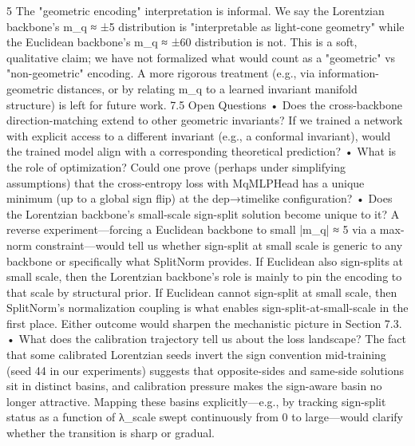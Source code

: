 	5	The "geometric encoding" interpretation is informal. We say the Lorentzian backbone's m_q ≈ ±5 distribution is "interpretable as light-cone geometry" while the Euclidean backbone's m_q ≈ ±60 distribution is not. This is a soft, qualitative claim; we have not formalized what would count as a "geometric" vs "non-geometric" encoding. A more rigorous treatment (e.g., via information-geometric distances, or by relating m_q to a learned invariant manifold structure) is left for future work.
7.5 Open Questions
	•	Does the cross-backbone direction-matching extend to other geometric invariants? If we trained a network with explicit access to a different invariant (e.g., a conformal invariant), would the trained model align with a corresponding theoretical prediction?
	•	What is the role of optimization? Could one prove (perhaps under simplifying assumptions) that the cross-entropy loss with MqMLPHead has a unique minimum (up to a global sign flip) at the dep→timelike configuration?
	•	Does the Lorentzian backbone's small-scale sign-split solution become unique to it? A reverse experiment—forcing a Euclidean backbone to small |m_q| ≈ 5 via a max-norm constraint—would tell us whether sign-split at small scale is generic to any backbone or specifically what SplitNorm provides. If Euclidean also sign-splits at small scale, then the Lorentzian backbone's role is mainly to pin the encoding to that scale by structural prior. If Euclidean cannot sign-split at small scale, then SplitNorm's normalization coupling is what enables sign-split-at-small-scale in the first place. Either outcome would sharpen the mechanistic picture in Section 7.3.
	•	What does the calibration trajectory tell us about the loss landscape? The fact that some calibrated Lorentzian seeds invert the sign convention mid-training (seed 44 in our experiments) suggests that opposite-sides and same-side solutions sit in distinct basins, and calibration pressure makes the sign-aware basin no longer attractive. Mapping these basins explicitly—e.g., by tracking sign-split status as a function of λ_scale swept continuously from 0 to large—would clarify whether the transition is sharp or gradual.


